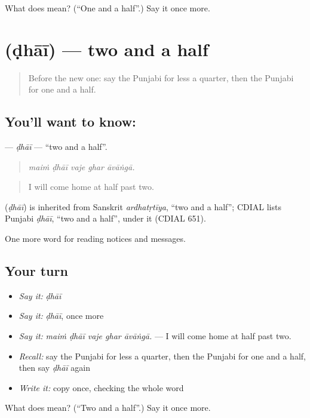 \begin{tcolorbox}[breakable,colback=teal!4,colframe=teal!35!black,title={Before you move on}]
What does  mean? (\textquotedblleft{}One and a half\textquotedblright{}.) Say it once more.
\end{tcolorbox}
\section[\texorpdfstring{\pa{ਢਾਈ} (ḍhāī)}{ਢਾਈ (ḍhāī)}]{ (ḍhāī) — two and a half}

\label{lesson:PA-C260-dhai}



\begin{quote}
Before the new one: say the Punjabi for less a quarter, then the Punjabi for one and a half.
\end{quote}

\subsection*{You'll want to know: }
\textbf{} — \emph{ḍhāī} — \textquotedblleft{}two and a half\textquotedblright{}.

\begin{quote}
    
\end{quote}

\begin{quote}
\emph{maiṁ ḍhāī vaje ghar āvāṅgā.}
\end{quote}

\begin{quote}
I will come home at half past two.
\end{quote}

\begin{cousinweb}
\textbf{} (\emph{ḍhāī}) is inherited from Sanskrit \emph{ardhatṛtīya}, \textquotedblleft{}two and a half\textquotedblright{}; CDIAL lists Punjabi \emph{ḍhāī}, \textquotedblleft{}two and a half\textquotedblright{}, under it (CDIAL 651).
\end{cousinweb}

\begin{grammarlens}[title={What you've built}]
One more word for reading notices and messages.
\end{grammarlens}

\subsection*{Your turn}
\begin{itemize}
\raggedright
  \item \emph{Say it:} \emph{ḍhāī}
  \item \emph{Say it:} \emph{ḍhāī}, once more
  \item \emph{Say it:} \emph{maiṁ ḍhāī vaje ghar āvāṅgā.} — I will come home at half past two.
  \item \emph{Recall:} say the Punjabi for less a quarter, then the Punjabi for one and a half, then say \emph{ḍhāī} again
  \item \emph{Write it:} copy \textbf{} once, checking the whole word
\end{itemize}

\begin{tcolorbox}[breakable,colback=teal!4,colframe=teal!35!black,title={Before you move on}]
What does  mean? (\textquotedblleft{}Two and a half\textquotedblright{}.) Say it once more.
\end{tcolorbox}
